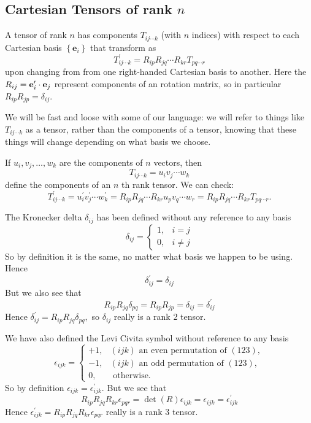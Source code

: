 \subsection{Cartesian Tensors of rank $ n $}
\begin{definition}
    A tensor of rank $n$ has components $T_{i j \cdots k}$ (with $n$ indices) with respect to each Cartesian basis $\left\{\mathbf{e}_{i}\right\}$ that transform as
    \[
        T_{i j \cdots k}^{\prime}=R_{i p} R_{j q} \cdots R_{k r} T_{p q \cdots r}
    \]
    upon changing from from one right-handed Cartesian basis to another. Here the $R_{i j}={\bf e}_i' \cdot {\bf e}_j$ represent components of an rotation matrix, so in particular $R_{i p} R_{j p}=\delta_{i j}$.
\end{definition}

We will be fast and loose with some of our language: we will refer to things like $T_{i j \cdots k}$ as a tensor, rather than the components of a tensor, knowing that these things will change depending on what basis we choose.
\begin{example}
    If $u_{i}, v_{j}, \dots, w_{k}$ are the components of $n$ vectors, then
    \[
    T_{i j \cdots k}=u_{i} v_{j} \cdots w_{k}
    \]
    define the components of an $n$ th rank tensor. We can check:
    \[
    T_{i j \cdots k}^{\prime}=u_{i}^{\prime} v_{j}^{\prime} \cdots w_{k}^{\prime}=R_{i p} R_{j q} \cdots R_{k r} u_{p} v_{q} \cdots w_{r}=R_{i p} R_{j q} \cdots R_{k r} T_{p q \cdots r}.
    \]
\end{example}
\begin{example}
    The Kronecker delta $\delta_{i j}$ has been defined without any reference to any basis
    \[
    \delta_{i j}=\begin{cases}
        1, & i=j \\
        0, & i \neq j
    \end{cases} 
    \]
    So by definition it is the same, no matter what basis we happen to be using. Hence
    \[
    \delta_{i j}^{\prime}=\delta_{i j}
    \]
    But we also see that
    \[
    R_{i p} R_{j q} \delta_{p q}=R_{i p} R_{j p}=\delta_{i j}=\delta_{i j}^{\prime}
    \]
    Hence $\delta_{i j}^{\prime}=R_{i p} R_{j q} \delta_{p q},$ so $\delta_{i j}$ really is a rank 2 tensor.
\end{example}
\begin{example}
    We have also defined the Levi Civita symbol without reference to any basis
    \[
    \epsilon_{i j k}=\begin{cases}
        +1, & (i j k) \text { an even permutation of }(123), \\
        -1, & (i j k) \text { an odd permutation of }(123), \\
        0, & \text { otherwise. }
    \end{cases} 
    \]
    So by definition $\epsilon_{i j k}=\epsilon_{i j k}^{\prime} .$ But we see that
    \[
    R_{i p} R_{j q} R_{k r} \epsilon_{p q r}=\operatorname{det}(R) \epsilon_{i j k}=\epsilon_{i j k}=\epsilon_{i j k}^{\prime}
    \]
    Hence $\epsilon_{i j k}^{\prime}=R_{i p} R_{j q} R_{k r} \epsilon_{p q r}$ really is a rank 3 tensor.
\end{example}

